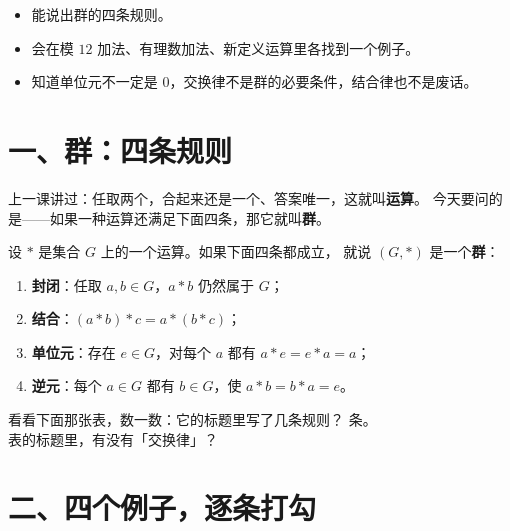 

\begin{mubiao}
  \begin{itemize}
    \item 能说出群的四条规则。
    \item 会在模 \(12\) 加法、有理数加法、新定义运算里各找到一个例子。
    \item 知道单位元不一定是 \(0\)，交换律不是群的必要条件，结合律也不是废话。
  \end{itemize}
\end{mubiao}

\section*{一、群：四条规则}

\noindent 上一课讲过：任取两个，合起来还是一个、答案唯一，这就叫\textbf{运算}。
今天要问的是——如果一种运算还满足下面四条，那它就叫\textbf{群}。

\begin{definition}[群]
  设 \(*\) 是集合 \(G\) 上的一个运算。如果下面四条都成立，
  就说 \((G,*)\) 是一个\textbf{群}：
  \begin{enumerate}
    \item \textbf{封闭}：任取 \(a,b\in G\)，\(a*b\) 仍然属于 \(G\)；
    \item \textbf{结合}：\((a*b)*c=a*(b*c)\)；
    \item \textbf{单位元}：存在 \(e\in G\)，对每个 \(a\) 都有 \(a*e=e*a=a\)；
    \item \textbf{逆元}：每个 \(a\in G\) 都有 \(b\in G\)，使 \(a*b=b*a=e\)。
  \end{enumerate}
\end{definition}

\begin{sikao}
  看看下面那张表，数一数：它的标题里写了几条规则？\underline{\hspace{2em}} 条。\\
  表的标题里，有没有「交换律」？\underline{\hspace{2em}}
\end{sikao}

\section*{二、四个例子，逐条打勾}


